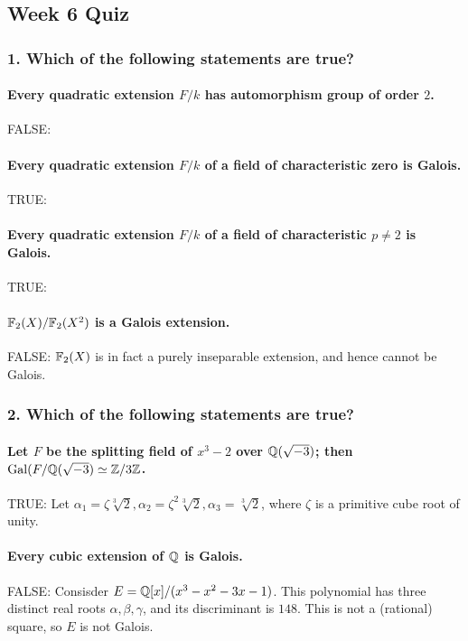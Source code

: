 \subsection[Quiz]{Week 6 Quiz}

\subsubsection*{1. Which of the following statements are true?}

\paragraph*{Every quadratic extension $F / k$ has automorphism group of order $2$.}
FALSE: %

\paragraph*{Every quadratic extension $F / k$ of a field of characteristic zero is Galois.}
TRUE: %

\paragraph*{Every quadratic extension $F / k$ of a field of characteristic $p \neq 2$ is Galois.}
TRUE: %

\paragraph*{$\mathbb{F}_2(X) / \mathbb{F}_2(X^2)$ is a Galois extension.}
FALSE: $\mathbb{F}_2(X)$ is in fact a purely inseparable extension, and hence cannot be Galois.

\subsubsection*{2. Which of the following statements are true?}

\paragraph*{Let $F$ be the splitting field of $x^3 - 2$ over $\mathbb{Q}(\sqrt{-3})$; then $\mathrm{Gal}(F / \mathbb{Q}(\sqrt{-3}) \simeq \mathbb{Z} / 3\mathbb{Z}$.}
TRUE: Let $\alpha_1 = \zeta\sqrt[3]{2}, \alpha_2 = \zeta^2\sqrt[3]{2}, \alpha_3 = \sqrt[3]{2}$, where $\zeta$ is a primitive cube root of unity.

\paragraph*{Every cubic extension of $\mathbb{Q}$ is Galois.}
FALSE: Consisder $E = \mathbb{Q}[x] / (x^3 - x^2 - 3x - 1)$. This polynomial has three distinct real roots $\alpha, \beta, \gamma$, and its discriminant is $148$. This is not a (rational) square, so $E$ is not Galois. 

